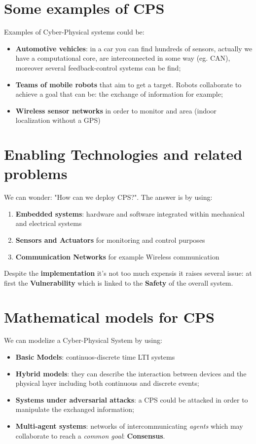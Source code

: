 \section{Some examples of CPS}
\noindent
Examples of Cyber-Physical systems could be:
\begin{itemize}
    \item \textbf{Automotive vehicles}: in a car you can find hundreds of sensors, actually we have a computational core, are interconnected in some way (eg. CAN), moreover several feedback-control systems can be find;
    \item \textbf{Teams of mobile robots} that aim to get a target. Robots collaborate to achieve a goal that can be: the exchange of information for example; 
    \item \textbf{Wireless sensor networks} in order to monitor and area (indoor localization without a GPS)
\end{itemize}

\section{Enabling Technologies and related problems}
\noindent
We can wonder: "How can we deploy CPS?". The answer is by using: 
\begin{enumerate}
    \setlength\itemsep{0em}
    \item \textbf{Embedded systems}: hardware and software integrated within mechanical and electrical systems
    \item \textbf{Sensors and Actuators} for monitoring and control purposes
    \item \textbf{Communication Networks} for example Wireless communication
\end{enumerate}
Despite the \textbf{implementation} it's not too much expensis it raises several issue: at first the \textbf{Vulnerability} which is linked to the \textbf{Safety} of the overall system.

\section{Mathematical models for CPS}
\noindent
We can modelize a Cyber-Physical System by using: 
\begin{itemize}
      \setlength\itemsep{0em}
    \item \textbf{Basic  Models}: continuos-discrete time LTI systems
    \item \textbf{Hybrid models}: they can describe the interaction between devices and the physical layer including both continuous and discrete events; 
    \item \textbf{Systems under adversarial attacks}: a CPS could be attacked in order to manipulate the exchanged information;
    \item \textbf{Multi-agent systems}: networks of intercommunicating \textit{agents} which may collaborate to reach a \textit{common goal}: \textbf{Consensus}.
\end{itemize}
